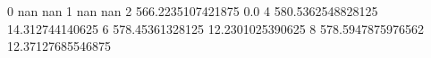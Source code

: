 0 nan nan
1 nan nan
2 566.2235107421875 0.0
4 580.5362548828125 14.312744140625
6 578.45361328125 12.2301025390625
8 578.5947875976562 12.37127685546875
